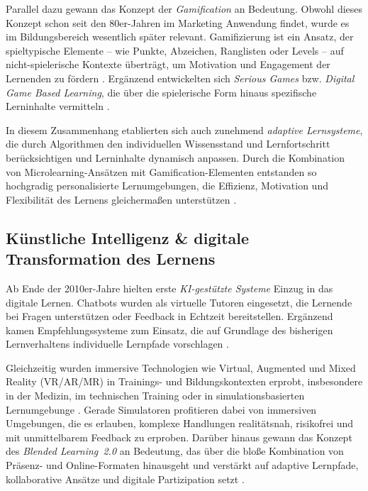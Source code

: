 Parallel dazu gewann das Konzept der \textit{Gamification} an Bedeutung. Obwohl dieses Konzept schon seit den 80er-Jahren im Marketing Anwendung findet, wurde es im Bildungsbereich wesentlich später relevant. Gamifizierung ist ein Ansatz, der spieltypische Elemente – wie Punkte, Abzeichen, Ranglisten oder Levels – auf nicht-spielerische Kontexte überträgt, um Motivation und Engagement der Lernenden zu fördern \parencite[S.~452]{schlag_gamifizierung_2021}. Ergänzend entwickelten sich \textit{Serious Games} bzw. \textit{Digital Game Based Learning}, die über die spielerische Form hinaus spezifische Lerninhalte vermitteln \parencite[S.~14]{niegemann_kompendium_2008}.

In diesem Zusammenhang etablierten sich auch zunehmend \textit{adaptive Lernsysteme}, die durch Algorithmen den individuellen Wissensstand und Lernfortschritt berücksichtigen und Lerninhalte dynamisch anpassen. Durch die Kombination von Microlearning-Ansätzen mit Gamification-Elementen entstanden so hochgradig personalisierte Lernumgebungen, die Effizienz, Motivation und Flexibilität des Lernens gleichermaßen unterstützen \parencite[S.~1f]{katsaris_adaptive_2021}.

\subsection{Künstliche Intelligenz \& digitale Transformation des Lernens}

Ab Ende der 2010er-Jahre hielten erste \textit{KI-gestützte Systeme} Einzug in das digitale Lernen. Chatbots wurden als virtuelle Tutoren eingesetzt, die Lernende bei Fragen unterstützen oder Feedback in Echtzeit bereitstellen. Ergänzend kamen Empfehlungssysteme zum Einsatz, die auf Grundlage des bisherigen Lernverhaltens individuelle Lernpfade vorschlagen \parencites[S.~1f]{harry_role_2023}[S.~42ff]{zhai_review_2021}.

Gleichzeitig wurden immersive Technologien wie Virtual, Augmented und Mixed Reality (VR/AR/MR) in Trainings- und Bildungskontexten erprobt, insbesondere in der Medizin, im technischen Training oder in simulationsbasierten Lernumgebunge \parencites[S.~3f]{rocha_bicalho_use_2023}[S.~251]{anatolevna_kastornova_international_2022}[S.~2f]{radianti_systematic_2020}. Gerade Simulatoren profitieren dabei von immersiven Umgebungen, die es erlauben, komplexe Handlungen realitätsnah, risikofrei und mit unmittelbarem Feedback zu erproben. Darüber hinaus gewann das Konzept des \textit{Blended Learning~2.0} an Bedeutung, das über die bloße Kombination von Präsenz- und Online-Formaten hinausgeht und verstärkt auf adaptive Lernpfade, kollaborative Ansätze und digitale Partizipation setzt \parencites{seufert_schulleitertagung_2014}{news_aktuell_gmbh_e-learning_2025}.

